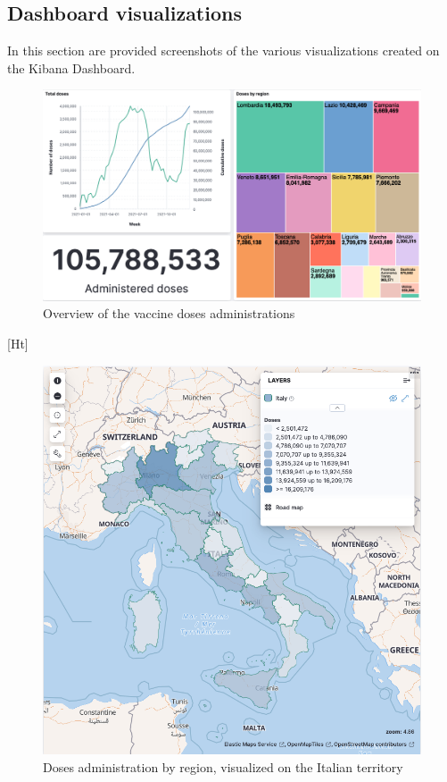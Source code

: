 \documentclass{article}
\begin{document}
\subsection{Dashboard visualizations}
In this section are provided screenshots of the various visualizations created on the Kibana Dashboard.
    \begin{figure}[Ht]
        \centering
        \includegraphics[scale=0.3]{ir databases/screenshots/adm_overview.png}
        \caption{Overview of the vaccine doses administrations}
        \label{fig:adm_overview}
    \end{figure}[Ht]
    \begin{figure}
        \centering
        \includegraphics[scale=0.3]{ir databases/screenshots/map.png}
        \caption{Doses administration by region, visualized on the Italian territory}
        \label{fig:map}
    \end{figure}
\end{document}
